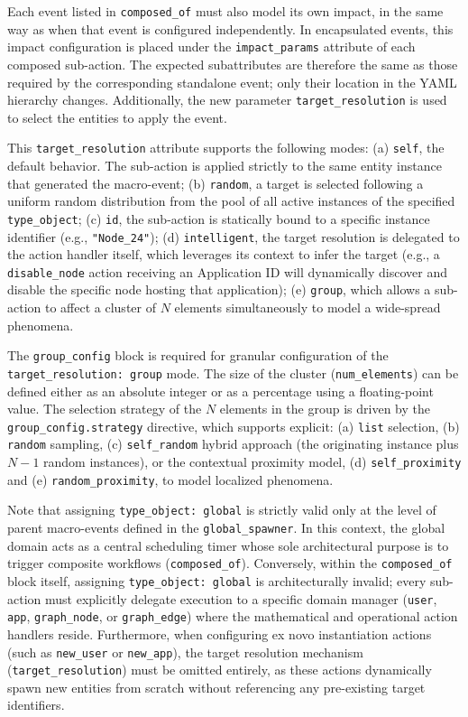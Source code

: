 \documentclass[ASNA]{USG} %
\begin{document}
Each event listed in \texttt{composed\_of} must also model its own impact, in the same way as when that event is configured independently. In encapsulated events, this impact configuration is placed under the \texttt{impact\_params} attribute of each composed sub-action. The expected subattributes are therefore the same as those required by the corresponding standalone event; only their location in the YAML hierarchy changes. Additionally, the new parameter \texttt{target\_resolution} is used to select the entities to apply the event.

This \texttt{target\_resolution} attribute supports the following modes: (a) \texttt{self}, the default behavior. The sub-action is applied strictly to the same entity instance that generated the macro-event; (b) \texttt{random}, a target is selected following a uniform random distribution from the pool of all active instances of the specified \texttt{type\_object}; (c) \texttt{id}, the sub-action is statically bound to a specific instance identifier (e.g., \texttt{"Node\_24"}); (d) \texttt{intelligent}, the target resolution is delegated to the action handler itself, which leverages its context to infer the target (e.g., a \texttt{disable\_node} action receiving an Application ID will dynamically discover and disable the specific node hosting that application); (e) \texttt{group}, which allows a sub-action to affect a cluster of $N$ elements simultaneously to model a wide-spread phenomena.

The \texttt{group\_config} block is required for granular configuration of the \texttt{target\_resolution: group} mode. The size of the cluster (\texttt{num\_elements}) can be defined either as an absolute integer or as a percentage using a floating-point value. The selection strategy of the $N$ elements in the group is driven by the \texttt{group\_config.strategy} directive, which supports explicit: (a) \texttt{list} selection, (b) \texttt{random} sampling, (c) \texttt{self\_random} hybrid approach (the originating instance plus $N-1$ random instances), or the contextual proximity model, (d) \texttt{self\_proximity} and (e) \texttt{random\_proximity}, to model localized phenomena.

Note that assigning \texttt{type\_object: global} is strictly valid only at the level of parent macro-events defined in the \texttt{global\_spawner}. In this context, the global domain acts as a central scheduling timer whose sole architectural purpose is to trigger composite workflows (\texttt{composed\_of}). Conversely, within the \texttt{composed\_of} block itself, assigning \texttt{type\_object: global} is architecturally invalid; every sub-action must explicitly delegate execution to a specific domain manager (\texttt{user}, \texttt{app}, \texttt{graph\_node}, or \texttt{graph\_edge}) where the mathematical and operational action handlers reside. Furthermore, when configuring ex novo instantiation actions (such as \texttt{new\_user} or \texttt{new\_app}), the target resolution mechanism (\texttt{target\_resolution}) must be omitted entirely, as these actions dynamically spawn new entities from scratch without referencing any pre-existing target identifiers.
\end{document}
